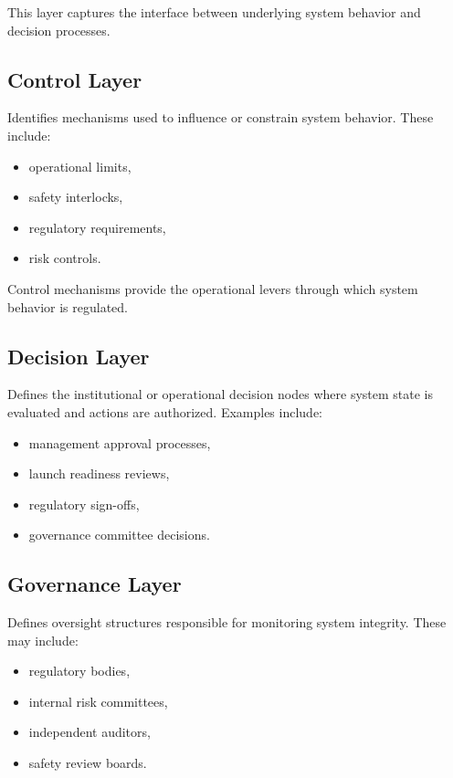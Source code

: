 This layer captures the interface between underlying system behavior and decision processes.

\subsection{Control Layer}

Identifies mechanisms used to influence or constrain system behavior. These include:

\begin{itemize}
\item operational limits,
\item safety interlocks,
\item regulatory requirements,
\item risk controls.
\end{itemize}

Control mechanisms provide the operational levers through which system behavior is regulated.

\subsection{Decision Layer}

Defines the institutional or operational decision nodes where system state is evaluated and actions are authorized. Examples include:

\begin{itemize}
\item management approval processes,
\item launch readiness reviews,
\item regulatory sign-offs,
\item governance committee decisions.
\end{itemize}

\subsection{Governance Layer}

Defines oversight structures responsible for monitoring system integrity. These may include:

\begin{itemize}
\item regulatory bodies,
\item internal risk committees,
\item independent auditors,
\item safety review boards.
\end{itemize}

